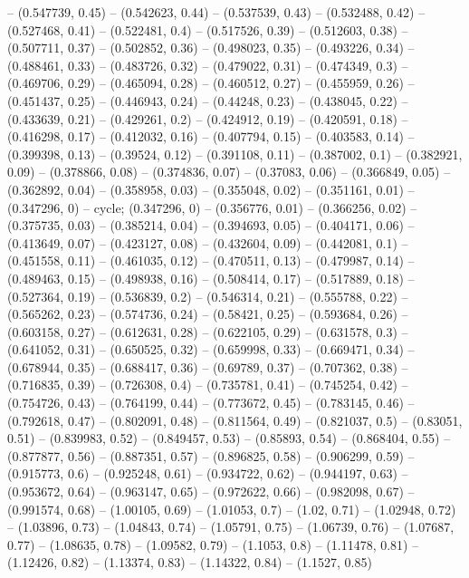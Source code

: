 -- (0.547739, 0.45)
-- (0.542623, 0.44)
-- (0.537539, 0.43)
-- (0.532488, 0.42)
-- (0.527468, 0.41)
-- (0.522481, 0.4)
-- (0.517526, 0.39)
-- (0.512603, 0.38)
-- (0.507711, 0.37)
-- (0.502852, 0.36)
-- (0.498023, 0.35)
-- (0.493226, 0.34)
-- (0.488461, 0.33)
-- (0.483726, 0.32)
-- (0.479022, 0.31)
-- (0.474349, 0.3)
-- (0.469706, 0.29)
-- (0.465094, 0.28)
-- (0.460512, 0.27)
-- (0.455959, 0.26)
-- (0.451437, 0.25)
-- (0.446943, 0.24)
-- (0.44248, 0.23)
-- (0.438045, 0.22)
-- (0.433639, 0.21)
-- (0.429261, 0.2)
-- (0.424912, 0.19)
-- (0.420591, 0.18)
-- (0.416298, 0.17)
-- (0.412032, 0.16)
-- (0.407794, 0.15)
-- (0.403583, 0.14)
-- (0.399398, 0.13)
-- (0.39524, 0.12)
-- (0.391108, 0.11)
-- (0.387002, 0.1)
-- (0.382921, 0.09)
-- (0.378866, 0.08)
-- (0.374836, 0.07)
-- (0.37083, 0.06)
-- (0.366849, 0.05)
-- (0.362892, 0.04)
-- (0.358958, 0.03)
-- (0.355048, 0.02)
-- (0.351161, 0.01)
-- (0.347296, 0)
-- cycle;
\drawBand (0.347296, 0)
-- (0.356776, 0.01)
-- (0.366256, 0.02)
-- (0.375735, 0.03)
-- (0.385214, 0.04)
-- (0.394693, 0.05)
-- (0.404171, 0.06)
-- (0.413649, 0.07)
-- (0.423127, 0.08)
-- (0.432604, 0.09)
-- (0.442081, 0.1)
-- (0.451558, 0.11)
-- (0.461035, 0.12)
-- (0.470511, 0.13)
-- (0.479987, 0.14)
-- (0.489463, 0.15)
-- (0.498938, 0.16)
-- (0.508414, 0.17)
-- (0.517889, 0.18)
-- (0.527364, 0.19)
-- (0.536839, 0.2)
-- (0.546314, 0.21)
-- (0.555788, 0.22)
-- (0.565262, 0.23)
-- (0.574736, 0.24)
-- (0.58421, 0.25)
-- (0.593684, 0.26)
-- (0.603158, 0.27)
-- (0.612631, 0.28)
-- (0.622105, 0.29)
-- (0.631578, 0.3)
-- (0.641052, 0.31)
-- (0.650525, 0.32)
-- (0.659998, 0.33)
-- (0.669471, 0.34)
-- (0.678944, 0.35)
-- (0.688417, 0.36)
-- (0.69789, 0.37)
-- (0.707362, 0.38)
-- (0.716835, 0.39)
-- (0.726308, 0.4)
-- (0.735781, 0.41)
-- (0.745254, 0.42)
-- (0.754726, 0.43)
-- (0.764199, 0.44)
-- (0.773672, 0.45)
-- (0.783145, 0.46)
-- (0.792618, 0.47)
-- (0.802091, 0.48)
-- (0.811564, 0.49)
-- (0.821037, 0.5)
-- (0.83051, 0.51)
-- (0.839983, 0.52)
-- (0.849457, 0.53)
-- (0.85893, 0.54)
-- (0.868404, 0.55)
-- (0.877877, 0.56)
-- (0.887351, 0.57)
-- (0.896825, 0.58)
-- (0.906299, 0.59)
-- (0.915773, 0.6)
-- (0.925248, 0.61)
-- (0.934722, 0.62)
-- (0.944197, 0.63)
-- (0.953672, 0.64)
-- (0.963147, 0.65)
-- (0.972622, 0.66)
-- (0.982098, 0.67)
-- (0.991574, 0.68)
-- (1.00105, 0.69)
-- (1.01053, 0.7)
-- (1.02, 0.71)
-- (1.02948, 0.72)
-- (1.03896, 0.73)
-- (1.04843, 0.74)
-- (1.05791, 0.75)
-- (1.06739, 0.76)
-- (1.07687, 0.77)
-- (1.08635, 0.78)
-- (1.09582, 0.79)
-- (1.1053, 0.8)
-- (1.11478, 0.81)
-- (1.12426, 0.82)
-- (1.13374, 0.83)
-- (1.14322, 0.84)
-- (1.1527, 0.85)
